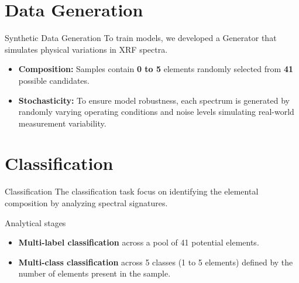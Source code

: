 \section{Data Generation}
\begin{frame}{Synthetic Data Generation}
    To train models, we developed a Generator that simulates physical variations in XRF spectra.
    \vspace{0.3cm}

    \begin{itemize}
        \item \textbf{Composition:} Samples contain \textbf{0 to 5} elements randomly selected from \textbf{41} possible candidates.
        \item \textbf{Stochasticity:} To ensure model robustness, each spectrum is generated by randomly varying operating conditions and noise levels simulating real-world measurement variability.
    \end{itemize}
\end{frame}



\section{Classification}
\begin{frame}{Classification}
    The classification task focus on identifying the elemental composition by analyzing spectral signatures.

    \vspace{0.4cm}
    \begin{block}{Analytical stages}
        \begin{itemize}
            \item \textbf{Multi-label classification} across a pool of 41 potential elements.
            \item \textbf{Multi-class classification} across 5 classes (1 to 5 elements) defined by the number of elements present in the sample.
        \end{itemize}
    \end{block}

    \vspace{0.3cm}
\end{frame}



